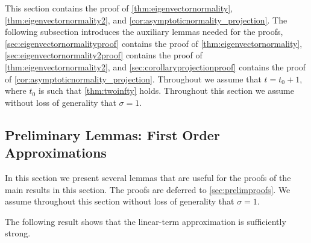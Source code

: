 \documentclass[10pt]{article}
\newcommand{\0}{{\mathbf{0}}}
\newcommand{\1}{{\mathbf{1}}}
\newcommand{\U}{{\mathbf{U}}}
\renewcommand{\t}{^{\top}}
\newcommand{\uhat}{\mathbf{\hat{U}}}
\newtheorem{theorem}{Theorem}
\newcommand{\p}{\mathbb{P}}
\newcommand{\inv}{^{-1}}
\renewcommand{\hat}{\widehat}
\renewcommand{\hat}{\widehat}
\begin{document}
 
 This section contains the proof of \cref{thm:eigenvectornormality}, \cref{thm:eigenvectornormality2}, and \cref{cor:asymptoticnormality_projection}.  The following subsection introduces the auxiliary lemmas needed for the proofs,  \cref{sec:eigenvectornormalityproof} contains the proof of \cref{thm:eigenvectornormality}, \cref{sec:eigenvectornormality2proof} contains the proof of \cref{thm:eigenvectornormality2}, and \cref{sec:corollaryprojectionproof} contains the proof of \cref{cor:asymptoticnormality_projection}. 
Throughout we assume that $t = t_0 + 1$, where $t_0$ is such that \cref{thm:twoinfty} holds.   Throughout this section we assume without loss of generality that $\sigma = 1$.  
 
 \subsection{Preliminary Lemmas: First Order Approximations}
 \label{sec:prelimlemmas}
 In this section we present several lemmas that are useful for the proofs of the main results in this section.  The proofs are deferred to \cref{sec:prelimproofs}.  We assume throughout this section without loss of generality that $\sigma = 1$.
 
 The following result shows that the linear-term approximation is sufficiently strong.  
 
 
\end{document}
